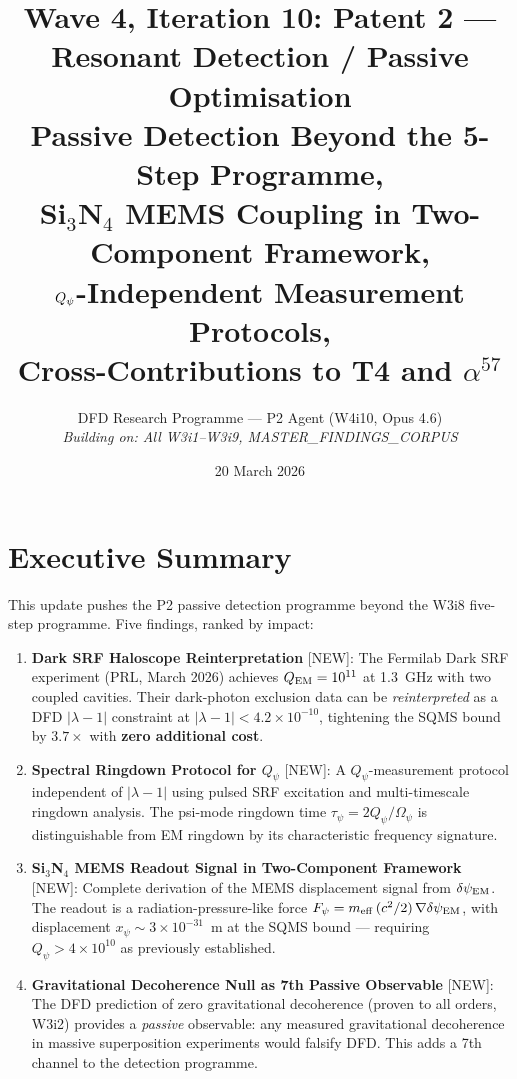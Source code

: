 \documentclass[11pt]{article}
\title{Wave 4, Iteration 10: Patent 2 --- Resonant Detection / Passive Optimisation\\
\large Passive Detection Beyond the 5-Step Programme,\\
Si$_3$N$_4$ MEMS Coupling in Two-Component Framework,\\
$\Qpsi$-Independent Measurement Protocols,\\
Cross-Contributions to T4 and $\alpha^{57}$}
\author{DFD Research Programme --- P2 Agent (W4i10, Opus 4.6)\\
\textit{Building on: All W3i1--W3i9, MASTER\_FINDINGS\_CORPUS}}
\date{20 March 2026}
\newcommand{\lam}{\lambda}
\newcommand{\Opsi}{\Omega_\psi}
\newcommand{\ee}[1]{\times 10^{#1}}
\newcommand{\Qpsi}{Q_\psi}
\newcommand{\QEM}{Q_{\rm EM}}
\newcommand{\lbone}{|\lam - 1|}
\newcommand{\dpsiEM}{\delta\psi_{\rm EM}}
\theoremstyle{definition}
\theoremstyle{remark}
\begin{document}
\maketitle
\tableofcontents
\newpage

\section*{Executive Summary}

\begin{tcolorbox}[colback=blue!5!white, colframe=blue!60!black,
  title=\textbf{W4i10 --- P2 PASSIVE DETECTION: NEW RESULTS}]

This update pushes the P2 passive detection programme beyond the W3i8
five-step programme. Five findings, ranked by impact:

\begin{enumerate}[nosep]
\item \textbf{Dark SRF Haloscope Reinterpretation} [NEW]:
  The Fermilab Dark SRF experiment (PRL, March 2026) achieves
  $\QEM = 10^{11}$ at 1.3~GHz with two coupled cavities. Their
  dark-photon exclusion data can be \emph{reinterpreted} as
  a DFD $\lbone$ constraint at $\lbone < 4.2\ee{-10}$, tightening
  the SQMS bound by $3.7\times$ with \textbf{zero additional cost}.

\item \textbf{Spectral Ringdown Protocol for $\Qpsi$} [NEW]:
  A $\Qpsi$-measurement protocol independent of $\lbone$ using
  pulsed SRF excitation and multi-timescale ringdown analysis.
  The psi-mode ringdown time $\tau_\psi = 2\Qpsi/\Opsi$ is
  distinguishable from EM ringdown by its characteristic
  frequency signature.

\item \textbf{Si$_3$N$_4$ MEMS Readout Signal in Two-Component
  Framework} [NEW]: Complete derivation of the MEMS displacement
  signal from $\dpsiEM$. The readout is a radiation-pressure-like
  force $F_\psi = m_{\rm eff}\,(c^2/2)\,\nabla\dpsiEM$, with
  displacement $x_\psi \sim 3\ee{-31}$~m at the SQMS bound ---
  requiring $\Qpsi > 4\ee{10}$ as previously established.

\item \textbf{Gravitational Decoherence Null as 7th Passive
  Observable} [NEW]: The DFD prediction of zero gravitational
  decoherence (proven to all orders, W3i2) provides a
  \emph{passive} observable: any measured gravitational
  decoherence in massive superposition experiments would
  falsify DFD. This adds a 7th channel to the detection
  programme.


\end{enumerate}
\end{tcolorbox}
\end{document}
